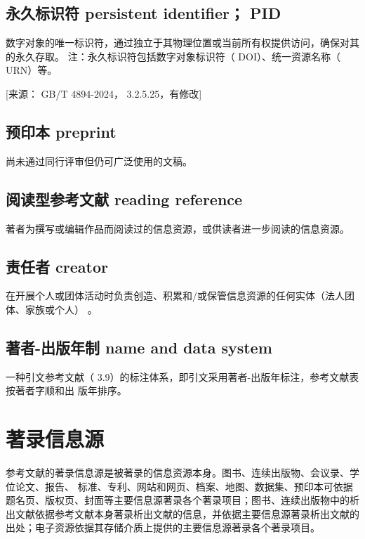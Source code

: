\documentclass{article}
\begin{document}
\subsection{永久标识符 persistent identifier； PID}
数字对象的唯一标识符，通过独立于其物理位置或当前所有权提供访问，确保对其的永久存取。
注：永久标识符包括数字对象标识符（ DOI）、统一资源名称（ URN）等。

[来源： GB/T 4894-2024， 3.2.5.25，有修改]

\subsection{预印本 preprint}
尚未通过同行评审但仍可广泛使用的文稿。


\subsection{阅读型参考文献 reading reference}
著者为撰写或编辑作品而阅读过的信息资源，或供读者进一步阅读的信息资源。

\subsection{责任者 creator}
在开展个人或团体活动时负责创造、积累和/或保管信息资源的任何实体（法人团体、家族或个人） 。


\subsection{著者-出版年制 name and data system}
一种引文参考文献（ 3.9）的标注体系，即引文采用著者-出版年标注，参考文献表按著者字顺和出
版年排序。


\titleformat{\subsection}[runin]{\bfseries}{\thesubsection}{1em}{\hspace{1em}}
\section{著录信息源}

参考文献的著录信息源是被著录的信息资源本身。图书、连续出版物、会议录、学位论文、报告、
标准、专利、网站和网页、档案、地图、数据集、预印本可依据题名页、版权页、封面等主要信息源著录各个著录项目；图书、连续出版物中的析出文献依据参考文献本身著录析出文献的信息，并依据主要信息源著录析出文献的出处；电子资源依据其存储介质上提供的主要信息源著录各个著录项目。
\end{document}
